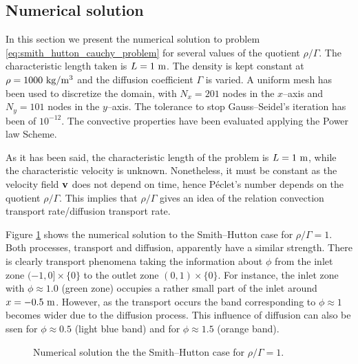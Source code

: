
\subsection{Numerical solution}

In this section we present the numerical solution to problem
\eqref{eq:smith_hutton_cauchy_problem} for several values of the quotient $\rho
/ \Gamma$. The characteristic length taken is $L = 1 \ \meter$. The density is
kept constant at $\rho = 1000 \ \kilo\gram / \meter^3$ and the diffusion
coefficient $\Gamma$ is varied. A uniform mesh has been used to discretize the
domain, with $N_x = 201$ nodes in the $x$--axis and $N_y = 101$ nodes in the
$y$--axis. The tolerance to stop Gauss--Seidel's iteration has been of
$10^{-12}$. The convective properties have been evaluated applying the
Power law Scheme. 

As it has been said, the characteristic length of the problem is $L = 1 \
\meter$, while the characteristic velocity is unknown. Nonetheless, it must be
constant as the velocity field $\vb{v}$ does not depend on time, hence Péclet's
number depends on the quotient $\rho / \Gamma$. This implies that $\rho /
\Gamma$ gives an idea of the relation convection transport rate/diffusion
transport rate.

Figure \ref{fig:smith_hutton_N201_Pe1.0e+00} shows the numerical solution to the
Smith--Hutton case for $\rho / \Gamma = 1$. Both processes, transport and
diffusion, apparently have a similar strength. There is clearly transport
phenomena taking the information about $\phi$ from the inlet zone $(-1, 0]
\times \{ 0 \}$ to the outlet zone $(0,1) \times \{ 0 \}$. For instance, the
inlet zone with $\phi \approx 1.0$ (green zone) occupies a rather small part of
the inlet around $x = -0.5 \ \meter$. However, as the transport occurs the band
corresponding to $\phi \approx 1$ becomes wider due to the diffusion process.
This influence of diffusion can also be ssen for $\phi \approx 0.5$ (light blue
band) and for $\phi \approx 1.5$ (orange band).

\begin{figure}[ht]
	\centering
	
	\caption{Numerical solution the the Smith--Hutton case for $\rho / \Gamma = 1$.}
	\label{fig:smith_hutton_N201_Pe1.0e+00}
\end{figure}

